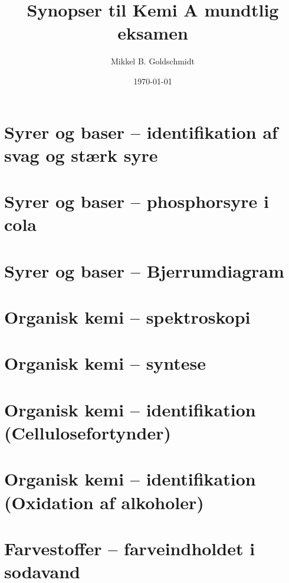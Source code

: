 \documentclass[10pt,a4paper]{article}
\author{Mikkel B. Goldschmidt}
\title{Synopser til Kemi A mundtlig eksamen}
\date{\today}
\theoremstyle{break}
\theoremstyle{nonumberplain}
\begin{document}
\maketitle
\tableofcontents
\pagebreak

\section{Syrer og baser – identifikation af svag og stærk syre}

\pagebreak


\section{Syrer og baser – phosphorsyre i cola}

\pagebreak


\section{Syrer og baser – Bjerrumdiagram}

\pagebreak


\section{Organisk kemi – spektroskopi}

\pagebreak


\section{Organisk kemi – syntese}

\pagebreak


\section{Organisk kemi – identifikation (Cellulosefortynder)}

\pagebreak

\section{Organisk kemi – identifikation (Oxidation af alkoholer)}

\pagebreak


\section{Farvestoffer – farveindholdet i sodavand}
\end{document}
